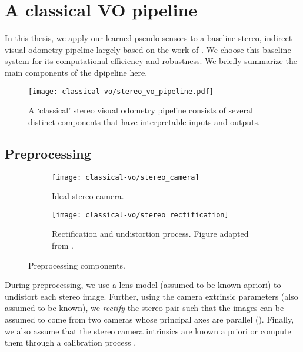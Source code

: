 \section{A classical VO pipeline}

In this thesis, we apply our learned pseudo-sensors to a baseline stereo, indirect visual odometry pipeline largely based on the work of \cite{furgale_phd11}. We choose this baseline system for its computational efficiency and robustness. We briefly summarize the main components of the dpipeline here.

\begin{figure}[h!]
\begin{center}
		\texttt{[image: classical-vo/stereo\_vo\_pipeline.pdf]}
		\caption{A `classical' stereo visual odometry pipeline consists of several distinct components that have interpretable inputs and outputs.}
  	\label{fig:vo_stereo_vo_pipeline}
\end{center}
\end{figure}

\subsection{Preprocessing}


\begin{figure}[h!]
     \centering
     \begin{subfigure}[b]{0.48\textwidth}
         \centering
     		\texttt{[image: classical-vo/stereo\_camera]}
			\caption{Ideal stereo camera.}
			 \label{fig:vo_stereo_camera}
     \end{subfigure}
     \hfill
     \begin{subfigure}[b]{0.48\textwidth}
         \centering
         \texttt{[image: classical-vo/stereo\_rectification]}
        \caption{Rectification and undistortion process. Figure adapted from \cite{florez2010}.}
         \label{fig:vo_undistort_recitfy}
	 \end{subfigure}
    \caption{Preprocessing components.}
        \label{fig:vo_preprocessing}
\end{figure}

During preprocessing, we use a lens model (assumed to be known apriori) to undistort each stereo image. Further, using the camera extrinsic parameters (also assumed to be known), we \textit{rectify} the stereo pair such that the images can be assumed to come from two cameras whose principal axes are parallel (). Finally, we also assume that the stereo camera intrinsics are known a priori or compute them through a calibration process \citep{Furgale2013-sl}.

